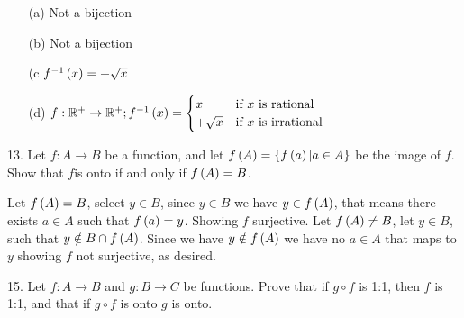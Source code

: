 \begin{mdframed}[style=darkAnswer,frametitle={Joe Starr}]
  \begin{itemize}
    \item [(a)]{
          Not a bijection
          }
    \item [(b)]{
          Not a bijection
          }
    \item [(c]{
          $f^{-1}\left(x\right)=+\sqrt{x}$
          }
    \item [(d)]{
          $f:\mathbb{R}^+\to \mathbb{R}^+; f^{-1}\left(x\right)=
            \begin{cases}
              x         & \text{if }x\text{ is rational}   \\
              +\sqrt{x} & \text{if }x\text{ is irrational} \\
            \end{cases}$
          }
  \end{itemize}
\end{mdframed}
\newpage
\begin{mdframed}[style=darkQuesion]
  13. Let $f:A\to B$ be a function, and let $f\left(A\right)=\left\{f\left(a\right)\vert a\in A\right\}$
  be the image of $f$. Show that $f$is onto if and only if $f\left(A\right)=B$.
\end{mdframed}

\begin{mdframed}[style=darkAnswer,frametitle={Joe Starr}]
  Let $f\left(A\right)=B$, select $y\in B$, since $y\in B$ we have $y\in f\left(A\right)$, that
  means there exists $a\in A$ such that $f\left(a\right)=y$. Showing $f$ surjective.
  Let $f\left(A\right)\neq B$, let $y\in B$, such that $y\notin B \cap f\left(A\right)$. Since
  we
  have $y\notin f\left(A\right)$ we have no $a\in A$ that maps to $y$ showing $f$ not
  surjective, as desired.
\end{mdframed}
\newpage
\begin{mdframed}[style=darkQuesion]
  15. Let $f:A\to B$ and $g:B\to C$ be functions. Prove that if $g\circ f$ is
  1:1, then $f$ is 1:1, and that if $g\circ f$ is onto $g$ is onto.
\end{mdframed}

